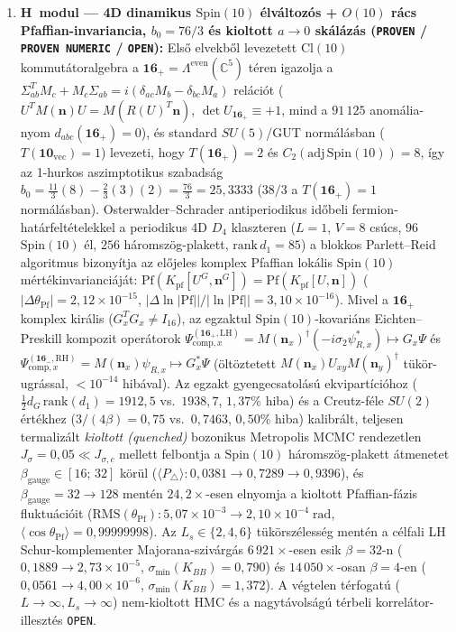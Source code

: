 \documentclass[11pt,a4paper]{article}
\begin{document}
\begin{enumerate}\setlength{\itemsep}{2pt}
\item \textbf{H~modul --- 4D dinamikus $\mathrm{Spin}(10)$ élváltozós + $O(10)$ rács Pfaffian-invariancia, $b_0 = 76/3$ és kioltott $a \to 0$ skálázás (\texttt{PROVEN} / \texttt{PROVEN NUMERIC} / \texttt{OPEN}):}
Első elvekből levezetett $\mathrm{Cl}(10)$ kommutátoralgebra a $\mathbf{16}_+ = \Lambda^{\mathrm{even}}(\mathbb{C}^5)$ téren igazolja a $\Sigma_{ab}^T M_c + M_c \Sigma_{ab} = i(\delta_{ac}M_b - \delta_{bc}M_a)$ relációt ($U^T M(\mathbf{n}) U = M(R(U)^T\mathbf{n})$, $\det U_{\mathbf{16}_+} \equiv +1$, mind a $91\,125$ anomália-nyom $d_{abc}(\mathbf{16}_+) = 0$), és standard $SU(5)$/GUT normálásban ($T(\mathbf{10}_{\mathrm{vec}})=1$) levezeti, hogy $T(\mathbf{16}_+) = 2$ és $C_2(\mathrm{adj}\,\mathrm{Spin}(10)) = 8$, így az 1-hurkos aszimptotikus szabadság $b_0 = \frac{11}{3}(8) - \frac{2}{3}(3)(2) = \frac{76}{3} = 25{,}3333$ ($38/3$ a $T(\mathbf{16}_+)=1$ normálásban). Osterwalder--Schrader antiperiodikus időbeli fermion-határfeltételekkel a periodikus 4D $D_4$ klaszteren ($L=1$, $V=8$ csúcs, $96$ $\mathrm{Spin}(10)$ él, $256$ háromszög-plakett, $\mathrm{rank}\,d_1 = 85$) a blokkos Parlett--Reid algoritmus \cite{Wimmer2012} bizonyítja az előjeles komplex Pfaffian lokális $\mathrm{Spin}(10)$ mértékinvarianciáját: $\mathrm{Pf}(K_{\mathrm{pf}}[U^G,\mathbf{n}^G]) = \mathrm{Pf}(K_{\mathrm{pf}}[U,\mathbf{n}])$ ($|\Delta\theta_{\mathrm{Pf}}| = 2{,}12\times 10^{-15}$, $|\Delta\ln|\mathrm{Pf}||/|\ln|\mathrm{Pf}|| = 3{,}10\times 10^{-16}$). Mivel a $\mathbf{16}_+$ komplex királis ($G_x^T G_x \ne I_{16}$), az egzaktul $\mathrm{Spin}(10)$-kovariáns Eichten--Preskill kompozit operátorok $\Psi_{\mathrm{comp},x}^{(\mathbf{16}_+,\mathrm{LH})} = M(\mathbf{n}_x)^\dagger(-i\sigma_2\psi_{R,x}^*) \mapsto G_x\Psi$ és $\Psi_{\mathrm{comp},x}^{(\mathbf{16}_-,\mathrm{RH})} = M(\mathbf{n}_x)\psi_{R,x} \mapsto G_x^*\Psi$ (öltöztetett $M(\mathbf{n}_x)U_{xy}M(\mathbf{n}_y)^\dagger$ tükör-ugrással, $<10^{-14}$ hibával). Az egzakt gyengecsatolású ekvipartícióhoz ($\frac{1}{2}d_G\,\mathrm{rank}(d_1) = 1912{,}5$ vs.\ $1938{,}7$, $1{,}37\%$ hiba) és a Creutz-féle $SU(2)$ értékhez ($3/(4\beta)=0{,}75$ vs.\ $0{,}7463$, $0{,}50\%$ hiba) \cite{Creutz1983} kalibrált, teljesen termalizált \emph{kioltott (quenched)} bozonikus Metropolis MCMC rendezetlen $J_\sigma = 0{,}05 \ll J_{\sigma,c}$ mellett felbontja a $\mathrm{Spin}(10)$ háromszög-plakett átmenetet $\beta_{\mathrm{gauge}}\in[16;\,32]$ körül ($\langle P_\triangle\rangle: 0{,}0381 \to 0{,}7289 \to 0{,}9396$), és $\beta_{\mathrm{gauge}} = 32 \to 128$ mentén $24{,}2\times$-esen elnyomja a kioltott Pfaffian-fázis fluktuációit ($\mathrm{RMS}(\theta_{\mathrm{Pf}}): 5{,}07\times 10^{-3} \to 2{,}10\times 10^{-4}\;\mathrm{rad}$, $\langle\cos\theta_{\mathrm{Pf}}\rangle = 0{,}99999998$). Az $L_s \in \{2,4,6\}$ tükörszélesség mentén a célfali LH Schur-komplementer Majorana-szivárgás $6\,921\times$-esen esik $\beta=32$-n ($0{,}1889 \to 2{,}73\times 10^{-5}$, $\sigma_{\min}(K_{BB}) = 0{,}790$) és $14\,050\times$-osan $\beta=4$-en ($0{,}0561 \to 4{,}00\times 10^{-6}$, $\sigma_{\min}(K_{BB}) = 1{,}372$). A végtelen térfogatú ($L \to \infty, L_s \to \infty$) nem-kioltott HMC és a nagytávolságú térbeli korrelátor-illesztés \texttt{OPEN}.


\end{enumerate}
\end{document}
